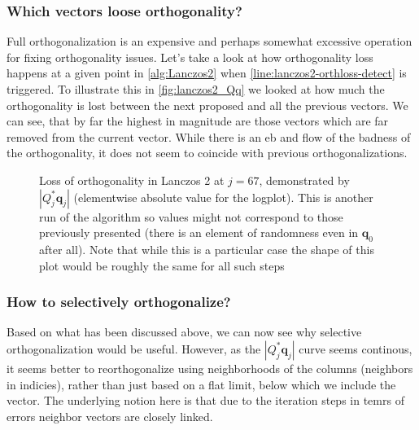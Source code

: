 \documentclass{article}
\begin{document}
\subsubsection*{Which vectors loose orthogonality?}
Full orthogonalization is an expensive and perhaps somewhat excessive operation for fixing orthogonality issues. Let's take a look at how orthogonality loss happens at a given point in \autoref{alg:Lanczos2} when \autoref{line:lanczos2-orthloss-detect} is triggered. To illustrate this in \autoref{fig:lanczos2_Qq} we looked at how much the orthogonality is lost between the next proposed and all the previous vectors. We can see, that by far the highest in magnitude are those vectors which are far removed from the current vector. While there is an eb and flow of the badness of the orthogonality, it does not seem to coincide with previous orthogonalizations.

\begin{figure}[h!]
	\centering
	\resizebox{0.8\textwidth}{!}{
		}
	\caption{Loss of orthogonality in Lanczos 2 at $j=67$, demonstrated by $\left|Q_j^\ast \textbf{q}_j\right|$ (elementwise absolute value for the logplot). This is another run of the algorithm so values might not correspond to those previously presented (there is an element of randomness even in $\textbf{q}_0$ after all). Note that while this is a particular case the shape of this plot would be roughly the same for all such steps}\label{fig:lanczos2_Qq}
\end{figure}

\subsubsection*{How to selectively orthogonalize?}
Based on what has been discussed above, we can now see why selective orthogonalization would be useful. However, as the $\left|Q_j^\ast \textbf{q}_j\right|$ curve seems continous, it seems better to reorthogonalize using neighborhoods of the columns (neighbors in indicies), rather than just based on a flat limit, below which we include the vector. The underlying notion here is that due to the iteration steps in temrs of errors neighbor vectors are closely linked. 
\end{document}
